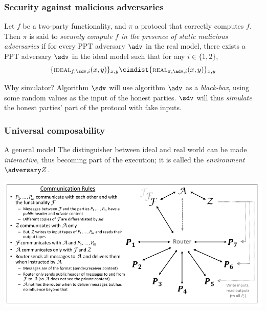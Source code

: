 \documentclass{beamer}
\begin{document}
    \begin{frame}
        \frametitle{Security against malicious adversaries}
        
        \begin{definition}
            Let $f$ be a two-party functionality, and $\pi$ a protocol that correctly computes $f$. Then $\pi$ is said to \emph{securely compute $f$ in the presence of static malicious adversaries} if for every PPT adversary $\adv$ in the real model, there exists a PPT adversary $\sdv$ in the ideal model such that for any $i\in\{1,2\}$,
            $$ \{ \textsc{\scriptsize IDEAL}_{f,\sdv,i}(x,y) \}_{x,y} \cindist \{ \textsc{\scriptsize REAL}_{\pi,\adv,i}(x,y) \}_{x,y}$$
        \end{definition}
    
        \begin{exampleblock}{Why simulator?}
            Algorithm $\sdv$ will use algorithm $\adv$ as a \emph{black-box}, using some random values as the input of the honest parties. $\sdv$ will thus \emph{simulate} the honest parties' part of the protocol with fake inputs.
        \end{exampleblock}
    \end{frame}


    \begin{frame}
        \frametitle{Universal composability}
        
        \begin{block}{A general model}
            The distinguisher between ideal and real world can be made \emph{interactive}, thus becoming part of the execution; it is called the \emph{environment} $\zdv$.
        \end{block}
        
        \begin{center}
            \includegraphics[width=\textwidth]{images/router}
        \end{center}
    \end{frame}
\end{document}
